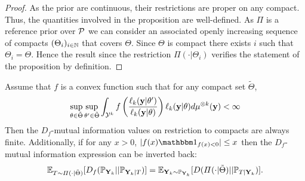 \begin{proof}
    As the prior are continuous, their restrictions are proper on any compact. Thus, the quantities involved in the proposition are well-defined. 
    As $\varPi$ is a reference prior over $\mathcal{P}$ we can consider an associated openly increasing sequence of compacts $(\Theta_i)_{i\in\mathbb{N}}$ that covers $\Theta$. Since $\Theta$ is compact there exists $i$ such that $\Theta_i=\Theta$. Hence the result since the restriction $\varPi(\cdot|\Theta_i)$ verifies the statement of the proposition by definition.
\end{proof}

\begin{prop}[Invertibility]
    Assume that $f$ is a convex function such that %
    for any compact set $\tilde\Theta$,
        \begin{equation}
            \sup_{\theta\in\tilde\Theta}\sup_{\theta'\in\tilde\Theta} \int_{\mathcal{Y}^k} f\left(\frac{\ell_k(\mathbf{y}|\theta')}{\ell_k(\mathbf{y}|\theta)}  \right) \ell_k(\mathbf{y}|\theta) d\mu^{\otimes k}(\mathbf{y})<\infty
        \end{equation}
    Then the $D_f$-mutual information values on restriction to compacts are always finite. Additionally, if for any $x>0$, $|f(x)\indic_{f(x)<0}|\leq x $ then the $D_f$-mutual information expression can be inverted back:
        \begin{equation}
            \mathbb{E}_{T\sim\varPi(\cdot|\tilde\Theta)}[D_f(\mathbb{P}_{\mathbf{Y}_k}||\mathbb{P}_{\mathbf{Y}_k|T})] 
                =\mathbb{E}_{\mathbf{Y}_k\sim\mathbb{P}_{\mathbf{Y}_k}} [D(\varPi(\cdot|\tilde\Theta)|| \mathbb{P}_{T|\mathbf{Y}_k} ) ]. 
        \end{equation}
\end{prop}

